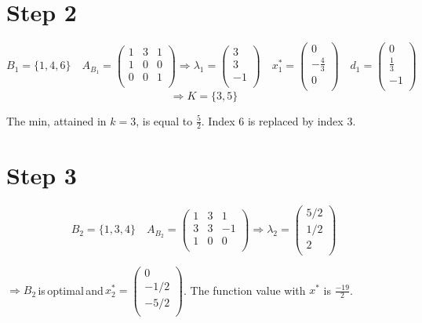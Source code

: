 \documentclass[a4paper,11pt,french]{article}
\begin{document}
   \section{Step 2}
  \begin{displaymath}
  B_1=\{1,4,6\}\quad A_{B_1}=\left(
\begin{array}{ccc}
1 & 3 & 1\\
1 & 0 & 0 \\
0 & 0 & 1\\
\end{array}
\right) \Rightarrow \lambda_1=\left(\begin{array}{c} 3\\ 3\\ -1\\ \end{array}\right)\quad x^*_1=\left(\begin{array}{c} 0\\ -\frac{4}{3}\\ 0\\ \end{array}\right)\quad d_1=\left(\begin{array}{c} 0\\ \frac{1}{3}\\ -1\\ \end{array}\right) \end{displaymath} 
  \begin{displaymath}
    \Rightarrow K=\{3,5\}
  \end{displaymath} 
  
  \smallskip \noindent The min, attained in $k=3$, is equal to $\frac{5}{2}$. Index 6 is replaced by index 3.
   
     \section{Step 3}
  \begin{displaymath}
  B_2=\{1,3,4\}\quad A_{B_2}=\left(
\begin{array}{ccc}
1 & 3 & 1\\
3 & 3 & -1 \\
1 & 0 & 0\\
\end{array}
\right) \Rightarrow \lambda_2=\left(\begin{array}{c} 5/2\\ 1/2\\ 2\\ \end{array}\right)
   \end{displaymath}
    
  $\Rightarrow B_2$\,is\,optimal\,and\,$x^*_2=\left(\begin{array}{c}0 \\ -1/2\\ -5/2\\ \end{array}\right)$. The function value with $x^*$ is $\frac{-19}{2}$.
    
\end{document}
